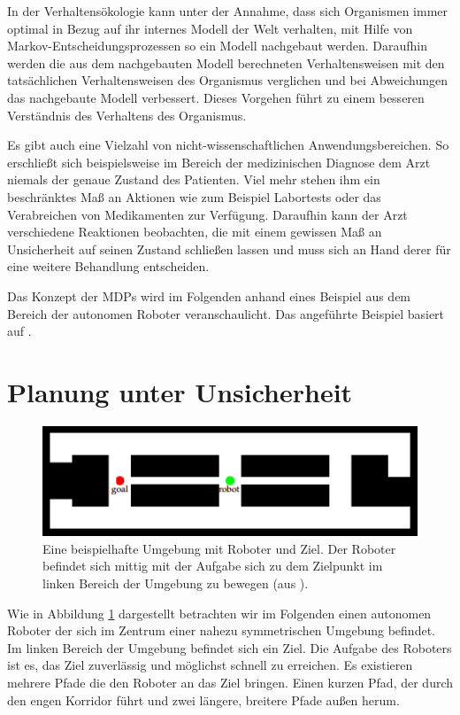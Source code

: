 \documentclass[a4paper]{IEEEtran}
\begin{document}
In der Verhaltensökologie kann unter der Annahme, dass sich Organismen immer optimal in Bezug auf ihr internes Modell der Welt verhalten, mit Hilfe von Markov-Entscheidungsprozessen so ein Modell nachgebaut werden. Daraufhin werden die aus dem nachgebauten Modell berechneten Verhaltensweisen mit den tatsächlichen Verhaltensweisen des Organismus verglichen und bei Abweichungen das nachgebaute Modell verbessert. Dieses Vorgehen führt zu einem besseren Verständnis des Verhaltens des Organismus.

Es gibt auch eine Vielzahl von nicht-wissenschaftlichen Anwendungsbereichen. So erschließt sich beispielsweise im Bereich der medizinischen Diagnose dem Arzt niemals der genaue Zustand des Patienten. Viel mehr stehen ihm ein beschränktes Maß an Aktionen wie zum Beispiel Labortests oder das Verabreichen von Medikamenten zur Verfügung. Daraufhin kann der Arzt verschiedene Reaktionen beobachten, die mit einem gewissen Maß an Unsicherheit auf seinen Zustand schließen lassen und muss sich an Hand derer für eine weitere Behandlung entscheiden. 

Das Konzept der MDPs wird im Folgenden anhand eines Beispiel aus dem Bereich der autonomen Roboter veranschaulicht. Das angeführte Beispiel basiert auf \cite{thrun2005probabilistic}.


\section{Planung unter Unsicherheit}
\begin{figure}[ht]
	\centering
	\includegraphics[scale=0.72]{images/autnmRobot_basicSituation.png}
	\caption{Eine beispielhafte Umgebung mit Roboter und Ziel. Der Roboter befindet sich mittig mit der Aufgabe sich zu dem Zielpunkt im linken Bereich der Umgebung zu bewegen (aus \cite{thrun2005probabilistic}).}
	\label{fig:autnmRob_bSit}
\end{figure}

Wie in Abbildung \ref{fig:autnmRob_bSit} dargestellt betrachten wir im Folgenden einen autonomen Roboter der sich im Zentrum einer nahezu symmetrischen Umgebung befindet. Im linken Bereich der Umgebung befindet sich ein Ziel. Die Aufgabe des Roboters ist es, das Ziel zuverlässig und möglichst schnell zu erreichen. Es existieren mehrere Pfade die den Roboter an das Ziel bringen. Einen kurzen Pfad, der durch den engen Korridor führt und zwei längere, breitere Pfade außen herum.
\end{document}

